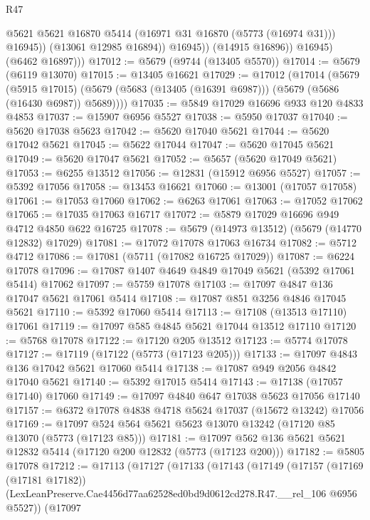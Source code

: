 \begin{lexlean}{R47}
\begin{coremodule}
                      @5621
                      @5621
                      @16870
                      @5414
                      (@16971 @31 @16870 (@5773 (@16974 @31)))
                      @16945))
                  (@13061 @12985 @16894))
                @16945))
            (@14915 @16896))
          @16945)
        (@6462 @16897)))
@17012 := @5679 (@9744 (@13405 @5570))
@17014 := @5679 (@6119 @13070)
@17015 := @13405 @16621
@17029 := @17012
    (@17014
      (@5679
        (@5915 @17015)
        (@5679 (@5683 (@13405 (@16391 @6987))) (@5679 (@5686 (@16430 @6987)) @5689))))
@17035 := @5849 @17029 @16696 @933 @120 @4833 @4853
@17037 := @15907 @6956 @5527
@17038 := @5950 @17037
@17040 := @5620 @17038 @5623
@17042 := @5620 @17040 @5621
@17044 := @5620 @17042 @5621
@17045 := @5622 @17044
@17047 := @5620 @17045 @5621
@17049 := @5620 @17047 @5621
@17052 := @5657 (@5620 @17049 @5621)
@17053 := @6255 @13512
@17056 := @12831 (@15912 @6956 @5527)
@17057 := @5392 @17056
@17058 := @13453 @16621
@17060 := @13001 (@17057 @17058)
@17061 := @17053 @17060
@17062 := @6263 @17061
@17063 := @17052 @17062
@17065 := @17035 @17063 @16717
@17072 := @5879 @17029 @16696 @949 @4712 @4850 @622 @16725
@17078 := @5679 (@14973 @13512) (@5679 (@14770 @12832) @17029)
@17081 := @17072 @17078 @17063 @16734
@17082 := @5712 @4712
@17086 := @17081 (@5711 (@17082 @16725 @17029))
@17087 := @6224 @17078
@17096 := @17087 @1407 @4649 @4849 @17049 @5621 (@5392 @17061 @5414) @17062
@17097 := @5759 @17078
@17103 := @17097 @4847 @136 @17047 @5621 @17061 @5414
@17108 := @17087 @851 @3256 @4846 @17045 @5621
@17110 := @5392 @17060 @5414
@17113 := @17108 (@13513 @17110) @17061
@17119 := @17097 @585 @4845 @5621 @17044 @13512 @17110
@17120 := @5768 @17078
@17122 := @17120 @205 @13512
@17123 := @5774 @17078
@17127 := @17119 (@17122 (@5773 (@17123 @205)))
@17133 := @17097 @4843 @136 @17042 @5621 @17060 @5414
@17138 := @17087 @949 @2056 @4842 @17040 @5621
@17140 := @5392 @17015 @5414
@17143 := @17138 (@17057 @17140) @17060
@17149 := @17097 @4840 @647 @17038 @5623 @17056 @17140
@17157 := @6372 @17078 @4838 @4718 @5624 @17037 (@15672 @13242) @17056
@17169 := @17097 @524 @564 @5621 @5623 @13070 @13242 (@17120 @85 @13070 (@5773 (@17123 @85)))
@17181 := @17097 @562 @136 @5621 @5621 @12832 @5414 (@17120 @200 @12832 (@5773 (@17123 @200)))
@17182 := @5805 @17078
@17212 := @17113
    (@17127
      (@17133
        (@17143
          (@17149
            (@17157
              (@17169 (@17181 @17182))
              (LexLeanPreserve.Cae4456d77aa62528ed0bd9d0612cd278.R47.__rel_106 @6956 @5527))
            (@17097

\end{coremodule}
\end{lexlean}
